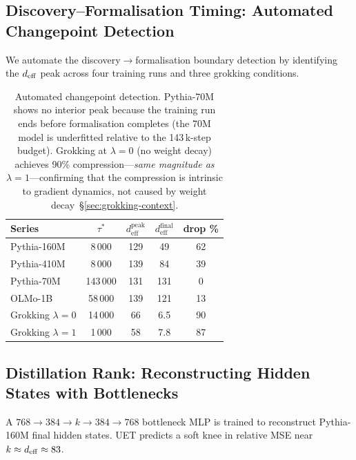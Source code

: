 \subsection{Discovery--Formalisation Timing: Automated Changepoint Detection}
\label{sec:changepoint}

We automate the discovery$\to$formalisation boundary detection by identifying
the $d_{\mathrm{eff}}$ peak across four training runs and three grokking conditions.

\begin{table}[H]
\centering\small
\begin{tabular}{lSSSS}
\toprule
Series & {$\tau^*$} & {$d_{\mathrm{eff}}^{\mathrm{peak}}$} &
         {$d_{\mathrm{eff}}^{\mathrm{final}}$} & {drop \%} \\
\midrule
Pythia-160M          & 8\,000   & 129 & 49  & 62 \\
Pythia-410M          & 8\,000   & 139 & 84  & 39 \\
Pythia-70M           & 143\,000 & 131 & 131 & 0  \\
OLMo-1B              & 58\,000  & 139 & 121 & 13 \\
Grokking $\lambda=0$ & 14\,000  & 66  & 6.5 & 90 \\
Grokking $\lambda=1$ & 1\,000   & 58  & 7.8 & 87 \\
\bottomrule
\end{tabular}
\caption{Automated changepoint detection.
Pythia-70M shows no interior peak because the training run ends before
formalisation completes (the 70M model is underfitted relative to the
143\,k-step budget).
Grokking at $\lambda=0$ (no weight decay) achieves 90\%
compression---\emph{same magnitude as $\lambda=1$}---confirming that the
compression is intrinsic to gradient dynamics, not caused by weight
decay~\S\ref{sec:grokking-context}.}
\label{tab:changepoint}
\end{table}

\subsection{Distillation Rank: Reconstructing Hidden States with Bottlenecks}
\label{sec:distill}

A $768 \to 384 \to k \to 384 \to 768$ bottleneck MLP is trained to
reconstruct Pythia-160M final hidden states.
UET predicts a soft knee in relative MSE near $k \approx d_{\mathrm{eff}} \approx 83$.


